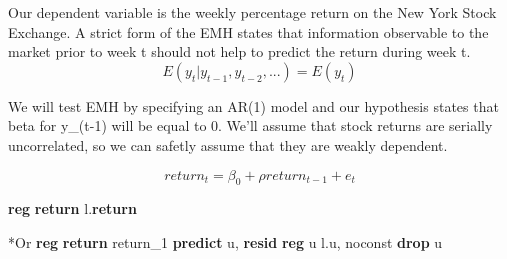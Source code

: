 \documentclass[
]{book}
\newenvironment{Shaded}{\begin{snugshade}}{\end{snugshade}}
\newcommand{\FunctionTok}[1]{\textcolor[rgb]{0.13,0.29,0.53}{\textbf{#1}}}
\newcommand{\KeywordTok}[1]{\textcolor[rgb]{0.13,0.29,0.53}{\textbf{#1}}}
\newcommand{\NormalTok}[1]{#1}
\newcommand{\OtherTok}[1]{\textcolor[rgb]{0.56,0.35,0.01}{#1}}
\begin{document}
Our dependent variable is the weekly percentage return on the New York Stock Exchange.
A strict form of the EMH states that information observable to the market prior to
week t should not help to predict the return during week t.
\[ E(y_t|y_{t-1},y_{t-2},...)=E(y_t) \]

We will test EMH by specifying an AR(1) model and our hypothesis states that
beta for y\_(t-1) will be equal to 0. We'll assume that stock returns are
serially uncorrelated, so we can safetly assume that they are weakly dependent.

\[ return_t = \beta_0 + \rho return_{t-1} + e_t \]

\begin{Shaded}
\begin{Highlighting}[]
\KeywordTok{reg} \FunctionTok{return} \OtherTok{l}\NormalTok{.}\FunctionTok{return}

\NormalTok{*Or}
\KeywordTok{reg} \FunctionTok{return}\NormalTok{ return\_1}
\KeywordTok{predict}\NormalTok{ u, }\KeywordTok{resid}
\KeywordTok{reg}\NormalTok{ u }\OtherTok{l}\NormalTok{.u, noconst}
\KeywordTok{drop}\NormalTok{ u}
\end{Highlighting}
\end{Shaded}
\end{document}
